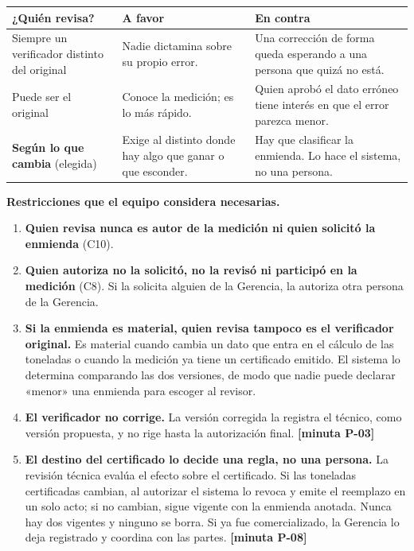 \documentclass[11pt,letterpaper]{article}
\newcommand{\cab}[1]{\textbf{\rmfamily #1}}
\newcommand{\resp}[1]{\textrm{\footnotesize\bfseries [minuta #1]}}
\begin{document}
\begin{center}
\small
\renewcommand{\arraystretch}{1.22}
\begin{tabularx}{\textwidth}{@{}L{3.6cm} Y Y@{}}
\toprule
\cab{¿Quién revisa?} & \cab{A favor} & \cab{En contra} \\
\midrule
Siempre un verificador distinto del original & Nadie dictamina sobre su propio error. & Una corrección de forma queda esperando a una persona que quizá no está. \\
Puede ser el original & Conoce la medición; es lo más rápido. & Quien aprobó el dato erróneo tiene interés en que el error parezca menor. \\
\textbf{Según lo que cambia} (elegida) & Exige al distinto donde hay algo que ganar o que esconder. & Hay que clasificar la enmienda. Lo hace el sistema, no una persona. \\
\bottomrule
\end{tabularx}
\end{center}

\textbf{Restricciones que el equipo considera necesarias.}

\begin{enumerate}
\item \textbf{Quien revisa nunca es autor de la medición ni quien solicitó la enmienda} (C10).
\item \textbf{Quien autoriza no la solicitó, no la revisó ni participó en la medición} (C8). Si la
      solicita alguien de la Gerencia, la autoriza otra persona de la Gerencia.
\item \textbf{Si la enmienda es material, quien revisa tampoco es el verificador original.} Es
      material cuando cambia un dato que entra en el cálculo de las toneladas o cuando la medición
      ya tiene un certificado emitido. El sistema lo determina comparando las dos versiones, de modo
      que nadie puede declarar «menor» una enmienda para escoger al revisor.
\item \textbf{El verificador no corrige.} La versión corregida la registra el técnico, como versión
      propuesta, y no rige hasta la autorización final. \resp{P-03}
\item \textbf{El destino del certificado lo decide una regla, no una persona.} La revisión técnica
      evalúa el efecto sobre el certificado. Si las toneladas certificadas cambian, al autorizar el
      sistema lo revoca y emite el reemplazo en un solo acto; si no cambian, sigue vigente con la
      enmienda anotada. Nunca hay dos vigentes y ninguno se borra. Si ya fue comercializado, la
      Gerencia lo deja registrado y coordina con las partes. \resp{P-08}
\end{enumerate}
\end{document}
